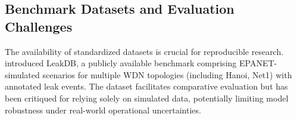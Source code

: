 \documentclass[final,5p,times,twocolumn,authoryear]{elsarticle}
\begin{document}



\subsection{Benchmark Datasets and Evaluation Challenges}

The availability of standardized datasets is crucial for reproducible research. \cite{kyriakou2018leakdb} introduced LeakDB, a publicly available benchmark comprising EPANET-simulated scenarios for multiple WDN topologies (including Hanoi, Net1) with annotated leak events. The dataset facilitates comparative evaluation but has been critiqued for relying solely on simulated data, potentially limiting model robustness under real-world operational uncertainties.
\end{document}
